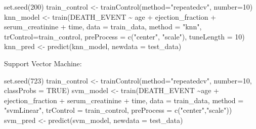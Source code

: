 \documentclass[
]{article}
\newenvironment{Shaded}{\begin{snugshade}}{\end{snugshade}}
\newcommand{\AttributeTok}[1]{\textcolor[rgb]{0.77,0.63,0.00}{#1}}
\newcommand{\ConstantTok}[1]{\textcolor[rgb]{0.00,0.00,0.00}{#1}}
\newcommand{\DecValTok}[1]{\textcolor[rgb]{0.00,0.00,0.81}{#1}}
\newcommand{\FunctionTok}[1]{\textcolor[rgb]{0.00,0.00,0.00}{#1}}
\newcommand{\NormalTok}[1]{#1}
\newcommand{\OtherTok}[1]{\textcolor[rgb]{0.56,0.35,0.01}{#1}}
\newcommand{\SpecialCharTok}[1]{\textcolor[rgb]{0.00,0.00,0.00}{#1}}
\newcommand{\StringTok}[1]{\textcolor[rgb]{0.31,0.60,0.02}{#1}}
\begin{document}
\begin{Shaded}
\begin{Highlighting}[]
\FunctionTok{set.seed}\NormalTok{(}\DecValTok{200}\NormalTok{)}
\NormalTok{train\_control }\OtherTok{\textless{}{-}} \FunctionTok{trainControl}\NormalTok{(}\AttributeTok{method=}\StringTok{"repeatedcv"}\NormalTok{, }\AttributeTok{number=}\DecValTok{10}\NormalTok{)}
\NormalTok{knn\_model }\OtherTok{\textless{}{-}} \FunctionTok{train}\NormalTok{(DEATH\_EVENT }\SpecialCharTok{\textasciitilde{}}\NormalTok{ age }\SpecialCharTok{+}\NormalTok{ ejection\_fraction }\SpecialCharTok{+}\NormalTok{ serum\_creatinine }\SpecialCharTok{+}\NormalTok{ time, }\AttributeTok{data =}\NormalTok{ train\_data, }\AttributeTok{method =} \StringTok{"knn"}\NormalTok{, }\AttributeTok{trControl=}\NormalTok{train\_control, }\AttributeTok{preProcess =} \FunctionTok{c}\NormalTok{(}\StringTok{"center"}\NormalTok{, }\StringTok{"scale"}\NormalTok{), }\AttributeTok{tuneLength =} \DecValTok{10}\NormalTok{)}
\NormalTok{knn\_pred }\OtherTok{\textless{}{-}} \FunctionTok{predict}\NormalTok{(knn\_model, }\AttributeTok{newdata =}\NormalTok{ test\_data)}
\end{Highlighting}
\end{Shaded}

Support Vector Machine:

\begin{Shaded}
\begin{Highlighting}[]
\FunctionTok{set.seed}\NormalTok{(}\DecValTok{723}\NormalTok{)}
\NormalTok{train\_control }\OtherTok{\textless{}{-}} \FunctionTok{trainControl}\NormalTok{(}\AttributeTok{method=}\StringTok{"repeatedcv"}\NormalTok{, }\AttributeTok{number=}\DecValTok{10}\NormalTok{, }\AttributeTok{classProbs =}  \ConstantTok{TRUE}\NormalTok{)}
\NormalTok{svm\_model }\OtherTok{\textless{}{-}} \FunctionTok{train}\NormalTok{(DEATH\_EVENT }\SpecialCharTok{\textasciitilde{}}\NormalTok{age }\SpecialCharTok{+}\NormalTok{ ejection\_fraction }\SpecialCharTok{+}\NormalTok{ serum\_creatinine }\SpecialCharTok{+}\NormalTok{ time, }\AttributeTok{data =}\NormalTok{ train\_data, }\AttributeTok{method =} \StringTok{"svmLinear"}\NormalTok{, }\AttributeTok{trControl =}\NormalTok{ train\_control, }\AttributeTok{preProcess =} \FunctionTok{c}\NormalTok{(}\StringTok{"center"}\NormalTok{,}\StringTok{"scale"}\NormalTok{))}
\NormalTok{svm\_pred }\OtherTok{\textless{}{-}} \FunctionTok{predict}\NormalTok{(svm\_model, }\AttributeTok{newdata =}\NormalTok{ test\_data)}
\end{Highlighting}
\end{Shaded}
\end{document}
